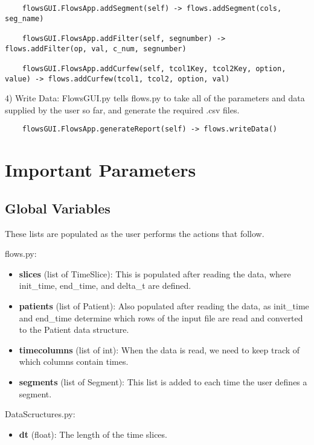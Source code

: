 \documentclass{article}
\begin{document}
\medskip

\begin{lstlisting}
	flowsGUI.FlowsApp.addSegment(self) -> flows.addSegment(cols, seg_name)
	
	flowsGUI.FlowsApp.addFilter(self, segnumber) -> flows.addFilter(op, val, c_num, segnumber)
	
	flowsGUI.FlowsApp.addCurfew(self, tcol1Key, tcol2Key, option, value) -> flows.addCurfew(tcol1, tcol2, option, val)
\end{lstlisting}

4) Write Data: FlowsGUI.py tells flows.py to take all of the parameters and data supplied by the user so far, and generate the required .csv files.

\medskip

\begin{lstlisting}
	flowsGUI.FlowsApp.generateReport(self) -> flows.writeData()
\end{lstlisting}

\section{Important Parameters}

\subsection*{Global Variables}

These lists are populated as the user performs the actions that follow.

flows.py:

\begin{itemize}
	\item \textbf{slices} (list of TimeSlice): This is populated after reading the data, where init\_time, end\_time, and delta\_t are defined.
	\item \textbf{patients} (list of Patient): Also populated after reading the data, as init\_time and end\_time determine which rows of the input file are read and converted to the Patient data structure.
	\item \textbf{timecolumns} (list of int): When the data is read, we need to keep track of which columns contain times.
	\item \textbf{segments} (list of Segment): This list is added to each time the user defines a segment.
\end{itemize}

DataScructures.py:

\begin{itemize}
	\item \textbf{dt} (float): The length of the time slices.
\end{itemize}
\end{document}
